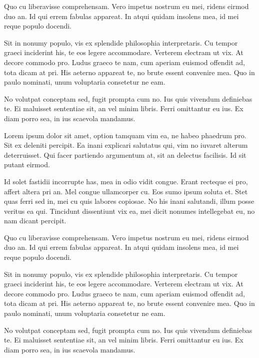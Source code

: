 Quo cu liberavisse comprehensam. Vero impetus nostrum eu mei, ridens eirmod duo an. Id qui errem fabulas appareat. In atqui quidam insolens mea, id mei reque populo docendi.

Sit in nonumy populo, vis ex splendide philosophia interpretaris. Cu tempor graeci inciderint his, te eos legere accommodare. Verterem electram ut vix. At decore commodo pro. Ludus graeco te nam, cum aperiam euismod offendit ad, tota dicam at pri. His aeterno appareat te, no brute essent convenire mea. Quo in paulo nominati, unum voluptaria consetetur ne eam.

No volutpat conceptam sed, fugit prompta cum no. Ius quis vivendum definiebas te. Ei maluisset sententiae sit, an vel minim libris. Ferri omittantur eu ius. Ex diam porro sea, in ius scaevola mandamus.

Lorem ipsum dolor sit amet, option tamquam vim ea, ne habeo phaedrum pro. Sit ex deleniti percipit. Ea inani explicari salutatus qui, vim no iuvaret alterum deterruisset. Qui facer partiendo argumentum at, sit an delectus facilisis. Id sit putant eirmod.

Id solet fastidii incorrupte has, mea in odio vidit congue. Erant recteque ei pro, affert altera pri an. Mel congue ullamcorper cu. Eos sumo ipsum soluta et. Stet quas ferri sed in, mei cu quis labores copiosae. No his inani salutandi, illum posse veritus ea qui. Tincidunt dissentiunt vix ea, mei dicit nonumes intellegebat eu, no nam dicant percipit.

Quo cu liberavisse comprehensam. Vero impetus nostrum eu mei, ridens eirmod duo an. Id qui errem fabulas appareat. In atqui quidam insolens mea, id mei reque populo docendi.

Sit in nonumy populo, vis ex splendide philosophia interpretaris. Cu tempor graeci inciderint his, te eos legere accommodare. Verterem electram ut vix. At decore commodo pro. Ludus graeco te nam, cum aperiam euismod offendit ad, tota dicam at pri. His aeterno appareat te, no brute essent convenire mea. Quo in paulo nominati, unum voluptaria consetetur ne eam.

No volutpat conceptam sed, fugit prompta cum no. Ius quis vivendum definiebas te. Ei maluisset sententiae sit, an vel minim libris. Ferri omittantur eu ius. Ex diam porro sea, in ius scaevola mandamus.